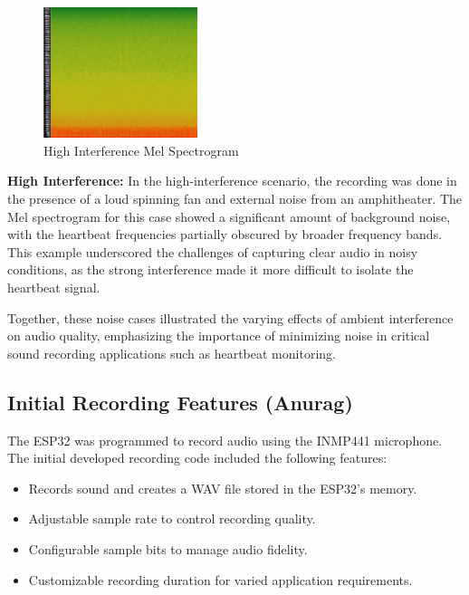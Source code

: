 \documentclass[conference]{IEEEtran}
\begin{document}
\begin{figure}
    \centering
    \includegraphics[width=0.4\textwidth]{Images/loudnoise.png}
    \caption{High Interference Mel Spectrogram}
    \label{fig:mel_spectrogram}
\end{figure}

\textbf{High Interference:}  
In the high-interference scenario, the recording was done in the presence of a loud spinning fan and external noise from an amphitheater. The Mel spectrogram for this case showed a significant amount of background noise, with the heartbeat frequencies partially obscured by broader frequency bands. This example underscored the challenges of capturing clear audio in noisy conditions, as the strong interference made it more difficult to isolate the heartbeat signal.

Together, these noise cases illustrated the varying effects of ambient interference on audio quality, emphasizing the importance of minimizing noise in critical sound recording applications such as heartbeat monitoring.


\subsection{Initial Recording Features (Anurag)}
The ESP32 was programmed to record audio using the INMP441 microphone. The initial developed recording code included the following features:
\begin{itemize}
    \item Records sound and creates a WAV file stored in the ESP32’s memory.
    \item Adjustable sample rate to control recording quality.
    \item Configurable sample bits to manage audio fidelity.
    \item Customizable recording duration for varied application requirements.
\end{itemize}
\end{document}
